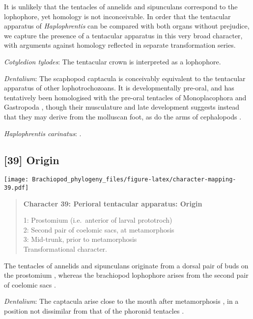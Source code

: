 \documentclass[openany]{book}
\theoremstyle{definition}
\theoremstyle{definition}
\theoremstyle{definition}
\theoremstyle{remark}
\begin{document}
It is unlikely that the tentacles of annelids and sipunculans correspond
to the lophophore, yet homology is not inconceivable. In order that the
tentacular apparatus of \emph{Haplophrentis} can be compared with both
organs without prejudice, we capture the presence of a tentacular
apparatus in this very broad character, with arguments against homology
reflected in separate transformation series.

\hypertarget{Cotyledion_tylodes-coding-38}{}
\emph{Cotyledion tylodes}: The tentacular crown \citep{Zhang2013} is
interpreted as a lophophore.

\hypertarget{Dentalium-coding-38}{}
\emph{Dentalium}: The scaphopod captacula is conceivably equivalent to
the tentacular apparatus of other lophotrochozoans. It is
developmentally pre-oral, and has tentatively been homologised with the
pre-oral tentacles of Monoplacophora and Gastropoda \citep{Steiner1992},
though their musculature and late development suggests instead that they
may derive from the molluscan foot, as do the arms of cephalopods
\citep{Wanninger2002M}.

\hypertarget{Haplophrentis_carinatus-coding-38}{}
\emph{Haplophrentis carinatus}: \citet{Moysiuk2017Hyolithsare}.

\subsection*{{[}39{]} Origin}\label{origin}

\texttt{[image: Brachiopod\_phylogeny\_files/figure-latex/character-mapping-39.pdf]}

\begin{quote}
\textbf{Character 39: Perioral tentacular apparatus: Origin}

1: Prostomium (i.e.~anterior of larval prototroch)\\
2: Second pair of coelomic sacs, at metamorphosis\\
3: Mid-trunk, prior to metamorphosis\\
Transformational character.
\end{quote}

The tentacles of annelids and sipunculans originate from a dorsal pair
of buds on the prostomium \citep{Adrianov2006}, whereas the brachiopod
lophophore arises from the second pair of coelomic sacs
\citep{Nielsen1991}.

\hypertarget{Dentalium-coding-39}{}
\emph{Dentalium}: The captacula arise close to the mouth after
metamorphosis \citep{Wanninger2002M}, in a position not dissimilar from
that of the phoronid tentacles \citep{Santagata2004}.
\end{document}
